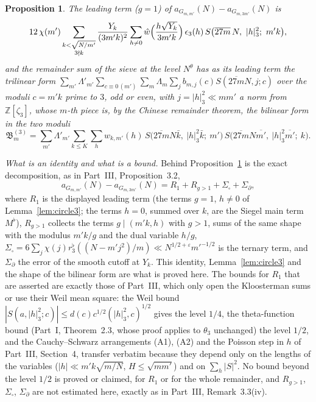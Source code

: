 \documentclass[11pt]{amsart}
\newtheorem{proposition}[theorem]{Proposition}
\theoremstyle{remark}
\newcommand{\Z}{\mathbb{Z}}
\newcommand{\e}{\varepsilon}
\begin{document}
\begin{proposition}\label{prop:eisdisp}
The leading term ($g=1$) of $a_{G_{m,m'}}(N)-a_{G_{m,3m'}}(N)$ is
\[
12\,\chi(m')\sum_{\substack{k<\sqrt{N/m'}\\ 3\nmid k}}\frac{Y_k}{(3m'k)^2}\sum_{h\ne0}\hat w\Bigl(\frac{h\sqrt{Y_k}}{3m'k}\Bigr)\,\epsilon_3(h)\,S\bigl(\overline{27m}\,N,\ |h|_3^2;\ m'k\bigr),
\]
and the remainder sum of the sieve at the level $N^\theta$ has as its leading term the trilinear form $\sum_{m'}\Lambda'_{m'}\sum_{c\equiv0\,(m')}\sum_m\Lambda_m\sum_jb_{m,j}(c)S(\overline{27m}N,j;c)$ over the moduli $c=m'k$ prime to $3$, odd or even, with $j=|h|_3^2\ll mm'$ a norm from $\Z[\zeta_3]$, whose $m$-th piece is, by the Chinese remainder theorem, the bilinear form in the two moduli
\[
\mathfrak B^{(3)}_m=\sum_{m'}\Lambda'_{m'}\sum_{k\le K}\sum_hw_{k,m'}(h)\,S\bigl(\overline{27m}N\bar k,\ |h|_3^2\bar k;\ m'\bigr)\,S\bigl(\overline{27m}N\overline{m'},\ |h|_3^2\overline{m'};\ k\bigr).
\]
\end{proposition}

\emph{What is an identity and what is a bound.} Behind Proposition~\ref{prop:eisdisp} is the exact decomposition, as in Part~III, Proposition~3.2,
\[
a_{G_{m,m'}}(N)-a_{G_{m,3m'}}(N)=R_1+R_{g>1}+\Sigma_\square+\Sigma_\partial ,
\]
where $R_1$ is the displayed leading term (the terms $g=1$, $h\ne0$ of Lemma~\ref{lem:circle3}; the terms $h=0$, summed over $k$, are the Siegel main term $M^\flat$), $R_{g>1}$ collects the terms $g\mid(m'k,h)$ with $g>1$, sums of the same shape with the modulus $m'k/g$ and the dual variable $h/g$, $\Sigma_\square=6\sum_j\chi(j)r_3^\flat((N-m'j^2)/m)\ll N^{1/2+\e}m'^{-1/2}$ is the ternary term, and $\Sigma_\partial$ the error of the smooth cutoff at $Y_k$. This identity, Lemma~\ref{lem:circle3} and the shape of the bilinear form are what is proved here. The bounds for $R_1$ that are asserted are exactly those of Part~III, which only open the Kloosterman sums or use their Weil mean square: the Weil bound $|S(a,|h|_3^2;c)|\le d(c)c^{1/2}(|h|_3^2,c)^{1/2}$ gives the level $1/4$, the theta-function bound (Part~I, Theorem~2.3, whose proof applies to $\theta_3$ unchanged) the level $1/2$, and the Cauchy--Schwarz arrangements (A1), (A2) and the Poisson step in $h$ of Part~III, Section~4, transfer verbatim because they depend only on the lengths of the variables ($|h|\ll m'k\sqrt{m/N}$, $H\le\sqrt{mm'}$) and on $\sum_h|S|^2$. No bound beyond the level $1/2$ is proved or claimed, for $R_1$ or for the whole remainder, and $R_{g>1}$, $\Sigma_\square$, $\Sigma_\partial$ are not estimated here, exactly as in Part~III, Remark~3.3(iv).
\end{document}
